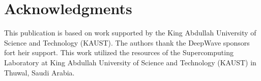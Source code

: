 \section*{\textbf{Acknowledgments}}
This publication is based on work supported by the King Abdullah University of Science and Technology (KAUST). The authors thank the DeepWave sponsors fort heir support. This work utilized the resources of the Supercomputing Laboratory at King Abdullah University of Science and Technology (KAUST) in Thuwal, Saudi Arabia.